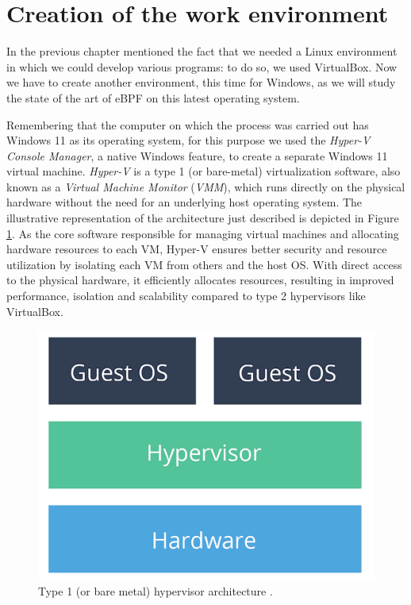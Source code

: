 \section{Creation of the work environment}

In the previous chapter mentioned the fact that we needed a Linux environment in which we could develop various programs: to do so, we used VirtualBox.
Now we have to create another environment, this time for Windows, as we will study the state of the art of eBPF on this latest operating system. 

Remembering that the computer on which the process was carried out has Windows 11 as its operating system, for this purpose we used the \textit{Hyper-V Console Manager}, a native Windows feature, to create a separate Windows 11 virtual machine.
\textit{Hyper-V} is a type 1 (or bare-metal) virtualization software, also known as a \textit{Virtual Machine Monitor} (\textit{VMM}), which runs directly on the physical hardware without the need for an underlying host operating system. 
The illustrative representation of the architecture just described is depicted in Figure \ref{fig:type_1_hypervisor}.
As the core software responsible for managing virtual machines and allocating hardware resources to each VM, Hyper-V ensures better security and resource utilization by isolating each VM from others and the host OS. 
With direct access to the physical hardware, it efficiently allocates resources, resulting in improved performance, isolation and scalability compared to type 2 hypervisors like VirtualBox.

\begin{figure}[h]
	\centering
	\includegraphics[width=0.7\linewidth]{images/Technologies/type_1_hypervisor.png}
	\caption{Type 1 (or bare metal) hypervisor architecture \cite{HypervisorsArchitectures}.}
	\label{fig:type_1_hypervisor}
\end{figure}

